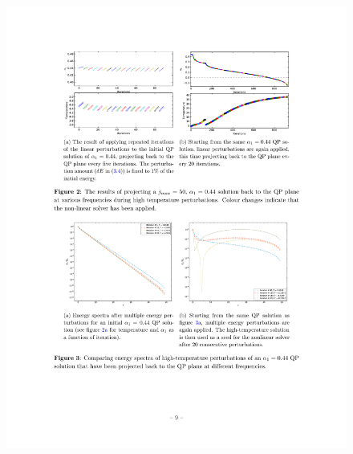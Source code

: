\documentclass[mathserif,10pt]{beamer}
\begin{document}
{{\begin{columns}
\begin{figure}
  \includegraphics[scale=0.85]{reop20}
  \end{figure}
  \end{columns}
}

}
\end{document}
